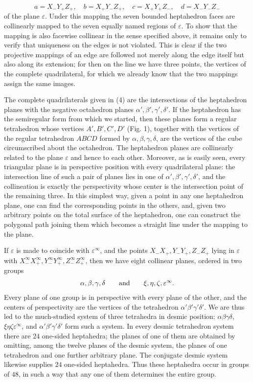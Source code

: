 \documentclass[11pt,a4paper]{article}
\begin{document}
\[
 a=X_-Y_+Z_+,
 \quad b=X_+Y_-Z_+,
 \quad c=X_+Y_+Z_-,
 \quad d=X_-Y_-Z_-
\]
of the plane $\varepsilon$. Under this mapping the seven bounded heptahedron faces are collinearly mapped to the seven equally named regions of $\varepsilon$. To show that the mapping is also facewise collinear in the sense specified above, it remains only to verify that uniqueness on the edges is not violated. This is clear if the two projective mappings of an edge are followed not merely along the edge itself but also along its extension; for then on the line we have three points, the vertices of the complete quadrilateral, for which we already know that the two mappings assign the same images.

The complete quadrilaterals given in (4) are the intersections of the heptahedron planes with the negative octahedron planes $\alpha',\beta',\gamma',\delta'$. If the heptahedron has the semiregular form from which we started, then these planes form a regular tetrahedron whose vertices $A',B',C',D'$ (Fig. 1), together with the vertices of the regular tetrahedron $ABCD$ formed by $\alpha,\beta,\gamma,\delta$, are the vertices of the cube circumscribed about the octahedron. The heptahedron planes are collinearly related to the plane $\varepsilon$ and hence to each other. Moreover, as is easily seen, every triangular plane is in perspective position with every quadrilateral plane: the intersection line of such a pair of planes lies in one of $\alpha',\beta',\gamma',\delta'$, and the collineation is exactly the perspectivity whose center is the intersection point of the remaining three. In this simplest way, given a point in any one heptahedron plane, one can find the corresponding points in the others, and, given two arbitrary points on the total surface of the heptahedron, one can construct the polygonal path joining them which becomes a straight line under the mapping to the plane.

If $\varepsilon$ is made to coincide with $\varepsilon^\infty$, and the points $X_-X_+,Y_-Y_+,Z_-Z_+$ lying in $\varepsilon$ with $X_-^\infty X_+^\infty,Y_-^\infty Y_+^\infty,Z_-^\infty Z_+^\infty$, then we have eight collinear planes, ordered in two groups
\[
 \alpha,\beta,\gamma,\delta
 \qquad\hbox{and}\qquad
 \xi,\eta,\zeta,\varepsilon^\infty.
\]
Every plane of one group is in perspective with every plane of the other, and the centers of perspectivity are the vertices of the tetrahedron $\alpha'\beta'\gamma'\delta'$. We are thus led to the much-studied system of three tetrahedra in desmic position: $\alpha\beta\gamma\delta$, $\xi\eta\zeta\varepsilon^\infty$, and $\alpha'\beta'\gamma'\delta'$ form such a system. In every desmic tetrahedron system there are $24$ one-sided heptahedra; the planes of one of them are obtained by omitting, among the twelve planes of the desmic system, the planes of one tetrahedron and one further arbitrary plane. The conjugate desmic system likewise supplies $24$ one-sided heptahedra. Thus these heptahedra occur in groups of $48$, in such a way that any one of them determines the entire group.
\end{document}
